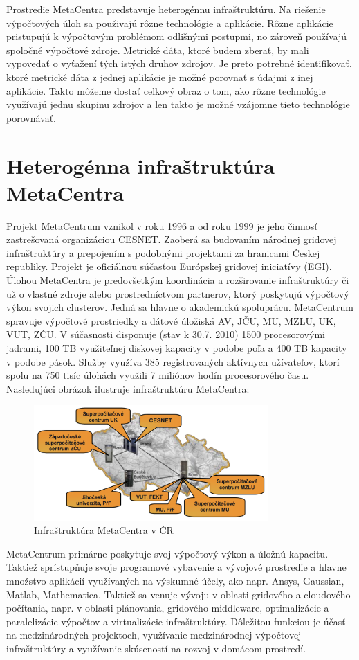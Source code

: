 \documentclass[printed,11pt,twoside,color,cover,table]{fithesis3}
\begin{document}
Prostredie MetaCentra predstavuje heterogénnu infraštruktúru. Na riešenie výpočtových úloh sa použivajú rôzne technológie a aplikácie. Rôzne aplikácie pristupujú k výpočtovým problémom odlišnými postupmi,
no zároveň používajú spoločné výpočtové zdroje. Metrické dáta, ktoré budem zberať, by mali vypovedať o vyťažení tých istých druhov zdrojov. Je preto potrebné identifikovať, ktoré metrické dáta z 
jednej aplikácie je možné porovnať s údajmi z inej aplikácie. Takto môžeme dostať celkový obraz o tom, ako rôzne technológie využívajú jednu skupinu zdrojov a len takto je možné vzájomne tieto technológie 
porovnávať. 


\chapter{Heterogénna infraštruktúra MetaCentra}
Projekt MetaCentrum vznikol v roku 1996 a od roku 1999 je jeho činnosť zastrešovaná organizáciou CESNET. Zaoberá sa budovaním národnej gridovej infraštruktúry a prepojením s podobnými projektami za hranicami
Českej republiky. Projekt je oficiálnou súčasťou Európskej gridovej iniciatívy (EGI). Úlohou MetaCentra je predovšetkým koordinácia a rozširovanie infraštruktúry či už o vlastné zdroje alebo prostredníctvom
partnerov, ktorý poskytujú výpočtový výkon svojich clusterov. Jedná sa hlavne o akademickú spoluprácu. MetaCentrum spravuje výpočtové prostriedky a dátové úložiská AV, JČU, MU, MZLU, UK, VUT, ZČU.
V súčasnosti disponuje (stav k 30.7. 2010) 1500 procesorovými jadrami, 100 TB využiteľnej diskovej kapacity v podobe poľa a 400 TB kapacity v podobe pások. Služby využíva 385 registrovaných aktívnych užívateľov, ktorí 
spolu na 750 tisíc úlohách využili 7 miliónov hodín procesorového času. Nasledujúci obrázok ilustruje infraštruktúru MetaCentra:
\begin{figure}[h]
\begin{center}
       \includegraphics[width=0.8\textwidth]{images/metacentrum.png}
       \caption{Infraštruktúra MetaCentra v ČR}
\end{center}
\end{figure}
MetaCentrum primárne poskytuje svoj výpočtový výkon a úložnú kapacitu. Taktiež sprístupňuje svoje programové vybavenie a vývojové prostredie a hlavne množstvo aplikácií využívaných na výskumné účely, ako napr. 
Ansys, Gaussian, Matlab, Mathematica. Taktiež sa venuje vývoju v oblasti gridového a cloudového počítania, napr. v oblasti plánovania, gridového middleware, optimalizácie a paralelizácie výpočtov a virtualizácie
infraštruktúry. Dôležitou funkciou je účasť na medzinárodných projektoch, využívanie medzinárodnej výpočtovej infraštruktúry a využívanie skúseností na rozvoj v domácom prostredí.\cite{metacentrum}
\end{document}
